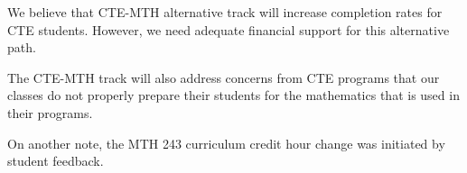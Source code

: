 We believe that CTE-MTH alternative track will increase completion rates for CTE students. However, we need adequate financial support for this alternative path.

The CTE-MTH track will also address concerns from CTE programs that our classes do not properly prepare their students for the mathematics that is used in their programs.

On another note, the MTH 243 curriculum credit hour change was initiated by student feedback.
